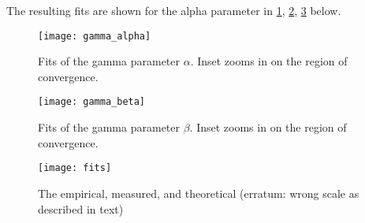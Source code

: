 The resulting fits are shown for the alpha parameter in \ref{fig:alpha}, \ref{fig:beta}, \ref{fig:fits} below.

\begin{figure}[h]
\texttt{[image: gamma\_alpha]}
\caption{Fits of the gamma parameter $\alpha$.  Inset zooms in on the region of convergence.}
\label{fig:alpha}
\end{figure}

\begin{figure}[h]
\texttt{[image: gamma\_beta]}
\caption{Fits of the gamma parameter $\beta$.  Inset zooms in on the region of convergence.}
\label{fig:beta}
\end{figure}

\begin{figure}[h]
\texttt{[image: fits]}
\caption{The empirical, measured, and theoretical (erratum: wrong scale as described in text)}
\label{fig:fits}
\end{figure}
